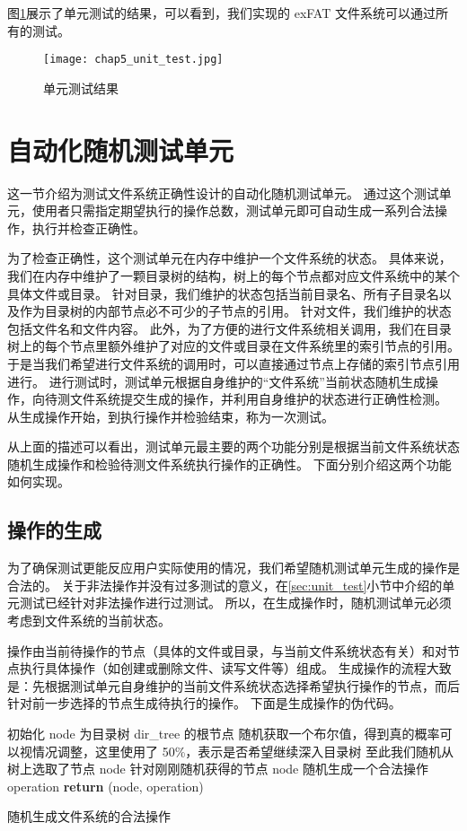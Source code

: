 图\ref{fig:unit_test}展示了单元测试的结果，可以看到，我们实现的 exFAT 文件系统可以通过所有的测试。

\begin{figure}[h]
    \centering
    \texttt{[image: chap5\_unit\_test.jpg]}
    \caption{单元测试结果}
    \label{fig:unit_test}
\end{figure}

\section{自动化随机测试单元}\label{sec:auto_test}
这一节介绍为测试文件系统正确性设计的自动化随机测试单元。
通过这个测试单元，使用者只需指定期望执行的操作总数，测试单元即可自动生成一系列合法操作，执行并检查正确性。

为了检查正确性，这个测试单元在内存中维护一个文件系统的状态。
具体来说，我们在内存中维护了一颗目录树的结构，树上的每个节点都对应文件系统中的某个具体文件或目录。
针对目录，我们维护的状态包括当前目录名、所有子目录名以及作为目录树的内部节点必不可少的子节点的引用。
针对文件，我们维护的状态包括文件名和文件内容。
此外，为了方便的进行文件系统相关调用，我们在目录树上的每个节点里额外维护了对应的文件或目录在文件系统里的索引节点的引用。
于是当我们希望进行文件系统的调用时，可以直接通过节点上存储的索引节点引用进行。
进行测试时，测试单元根据自身维护的“文件系统”当前状态随机生成操作，向待测文件系统提交生成的操作，并利用自身维护的状态进行正确性检测。
从生成操作开始，到执行操作并检验结束，称为一次测试。

从上面的描述可以看出，测试单元最主要的两个功能分别是根据当前文件系统状态随机生成操作和检验待测文件系统执行操作的正确性。
下面分别介绍这两个功能如何实现。

\subsection{操作的生成}
为了确保测试更能反应用户实际使用的情况，我们希望随机测试单元生成的操作是合法的。
关于非法操作并没有过多测试的意义，在\ref{sec:unit_test}小节中介绍的单元测试已经针对非法操作进行过测试。
所以，在生成操作时，随机测试单元必须考虑到文件系统的当前状态。

操作由当前待操作的节点（具体的文件或目录，与当前文件系统状态有关）和对节点执行具体操作（如创建或删除文件、读写文件等）组成。
生成操作的流程大致是：先根据测试单元自身维护的当前文件系统状态选择希望执行操作的节点，而后针对前一步选择的节点生成待执行的操作。
下面是生成操作的伪代码。

\begin{algorithm}[H]
    \SetAlgoLined
    初始化 node 为目录树 dir\_tree 的根节点 \;
     {
        随机获取一个布尔值，得到真的概率可以视情况调整，这里使用了 50\%，表示是否希望继续深入目录树 \;
    }
    至此我们随机从树上选取了节点 node \;
    针对刚刚随机获得的节点 node 随机生成一个合法操作 operation \;
    \textbf{return} (node, operation) \;
    \caption{随机生成文件系统的合法操作}
\end{algorithm}

